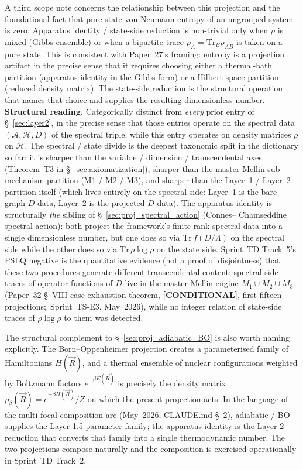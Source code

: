 \documentclass[11pt]{article}
\begin{document}
A third scope note concerns the relationship between this projection
and the foundational fact that pure-state von Neumann entropy of an
ungrouped system is zero.  Apparatus identity / state-side reduction
is non-trivial only when $\rho$ is mixed (Gibbs ensemble) or when a
bipartite trace $\rho_A = \mathrm{Tr}_B \rho_{AB}$ is taken on a pure
state.  This is consistent with Paper~27's framing: entropy is a
projection artifact in the precise sense that it requires choosing
either a thermal-bath partition (apparatus identity in the Gibbs
form) or a Hilbert-space partition (reduced density matrix).  The
state-side reduction is the structural operation that names that
choice and supplies the resulting dimensionless number.\\
\textbf{Structural reading.}  Categorically distinct from
\emph{every} prior entry of \S~\ref{sec:layer2}, in the precise
sense that those entries operate on the spectral data $(\mathcal{A},
\mathcal{H}, D)$ of the spectral triple, while this entry operates
on density matrices $\rho$ on $\mathcal{H}$.  The spectral / state
divide is the deepest taxonomic split in the dictionary so far: it
is sharper than the variable / dimension / transcendental axes
(Theorem~T3 in \S~\ref{sec:axiomatization}), sharper than
the master-Mellin sub-mechanism partition (M1 / M2 / M3), and sharper
than the Layer~1 / Layer~2 partition itself (which lives entirely on
the spectral side: Layer~1 is the bare graph $D$-data, Layer~2 is the
projected $D$-data).  The apparatus identity is structurally
\emph{the} sibling of \S~\ref{sec:proj_spectral_action} (Connes--%
Chamseddine spectral action): both project the framework's
finite-rank spectral data into a single dimensionless number, but
one does so via $\mathrm{Tr}\,f(D/\Lambda)$ on the spectral side
while the other does so via $\mathrm{Tr}\,\rho\log\rho$ on the
state side.  Sprint~TD Track~5's PSLQ negative is the quantitative
evidence (not a proof of disjointness) that these two procedures
generate different transcendental content: spectral-side traces of
operator functions of $D$ live in the master Mellin engine
$M_1 \cup M_2 \cup M_3$ (Paper~32 \S~VIII case-exhaustion theorem,
\textbf{[CONDITIONAL]}, first fifteen projections;\ Sprint~TS-E3,
May~2026), while no integer relation of state-side traces of
$\rho \log \rho$ to them was detected.

The structural complement to \S~\ref{sec:proj_adiabatic_BO} is also
worth naming explicitly.  The Born--Oppenheimer projection creates a
parameterised family of Hamiltonians $H(\vec{R})$, and a thermal
ensemble of nuclear configurations weighted by Boltzmann factors
$e^{-\beta E(\vec{R})}$ is precisely the density matrix
$\rho_\beta(\vec{R}) = e^{-\beta H(\vec{R})}/Z$ on which the present
projection acts.  In the language of the multi-focal-composition arc
(May~2026, CLAUDE.md \S~2), adiabatic / BO supplies the Layer-1.5
parameter family; the apparatus identity is the Layer-2 reduction
that converts that family into a single thermodynamic number.  The
two projections compose naturally and the composition is exercised
operationally in Sprint~TD Track~2.
\end{document}
